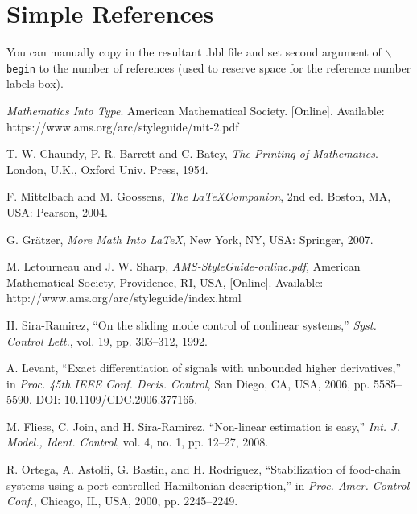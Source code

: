 \documentclass[lettersize,journal]{IEEEtran}
\begin{document}
%
%
\section{Simple References}
You can manually copy in the resultant .bbl file and set second argument of $\backslash${\tt{begin}} to the number of references
(used to reserve space for the reference number labels box).

\begin{thebibliography}{1}
	
	
	{\it{Mathematics Into Type}}. American Mathematical Society. [Online]. Available: https://www.ams.org/arc/styleguide/mit-2.pdf
	
	T. W. Chaundy, P. R. Barrett and C. Batey, {\it{The Printing of Mathematics}}. London, U.K., Oxford Univ. Press, 1954.
	
	F. Mittelbach and M. Goossens, {\it{The \LaTeX Companion}}, 2nd ed. Boston, MA, USA: Pearson, 2004.
	
	G. Gr\"atzer, {\it{More Math Into LaTeX}}, New York, NY, USA: Springer, 2007.
	
	M. Letourneau and J. W. Sharp, {\it{AMS-StyleGuide-online.pdf,}} American Mathematical Society, Providence, RI, USA, [Online]. Available: http://www.ams.org/arc/styleguide/index.html
	
	H. Sira-Ramirez, ``On the sliding mode control of nonlinear systems,'' \textit{Syst. Control Lett.}, vol. 19, pp. 303--312, 1992.
	
	A. Levant, ``Exact differentiation of signals with unbounded higher derivatives,''  in \textit{Proc. 45th IEEE Conf. Decis.
		Control}, San Diego, CA, USA, 2006, pp. 5585--5590. DOI: 10.1109/CDC.2006.377165.
	
	M. Fliess, C. Join, and H. Sira-Ramirez, ``Non-linear estimation is easy,'' \textit{Int. J. Model., Ident. Control}, vol. 4, no. 1, pp. 12--27, 2008.
	
	R. Ortega, A. Astolfi, G. Bastin, and H. Rodriguez, ``Stabilization of food-chain systems using a port-controlled Hamiltonian description,'' in \textit{Proc. Amer. Control Conf.}, Chicago, IL, USA,
	2000, pp. 2245--2249.
	
\end{thebibliography}
\end{document}
